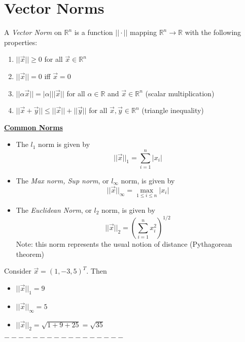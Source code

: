\documentclass[12pt]{article}
\newcommand{\vecx}{\ensuremath{\vec{x}}}
\newcommand{\vecy}{\ensuremath{\vec{y}}}
\newenvironment{definition}[1][Definition]{\begin{trivlist}
\item[\hskip \labelsep {\bfseries #1}]}{\end{trivlist}}
\newenvironment{example}[1][Example]{\begin{trivlist}
\item[\hskip \labelsep {\bfseries #1}]}{\end{trivlist}}
\begin{document}
\section{Vector Norms}

\begin{definition}

A \textit{Vector Norm} on $\mathbb{R}^n$ is a function $||\cdot||$ mapping
$\mathbb{R}^n \rightarrow \mathbb{R}$ with the following properties:

\begin{enumerate}
\item $|| \vecx|| \geq 0$ for all $\vecx \in \mathbb{R}^n$
\item $|| \vecx|| = 0$ iff $\vecx = 0$
\item $|| \alpha\vecx|| = |\alpha| ||\vecx||$ for all $\alpha\in\mathbb{R}$  
and $\vecx \in \mathbb{R}^n$ (scalar multiplication)
\item $|| \vecx + \vecy|| \leq ||\vecx|| + ||\vecy||$ for all $\vecx,\vecy \in 
\mathbb{R}^n$ (triangle inequality)
\end{enumerate}
\end{definition}
\pagebreak

\underline{\textbf{Common Norms}}

\begin{itemize}
\item The $l_1$ norm is given by
\[
||\vecx||_1 = \sum_{i=1}^n|x_i|
\]
\item The \textit{Max norm, Sup norm}, or $l_\infty$ norm, is given by
\[
||\vecx||_\infty = \max_{1\leq i\leq n} |x_i|
\]
\item The \textit{Euclidean Norm}, or $l_2$ norm, is given by
\[
||\vecx||_2 = \left(\sum_{i=1}^n x_i^2\right)^{1/2}
\]
Note: this norm represents the usual notion of distance (Pythagorean theorem)
\end{itemize}

\begin{example}
Consider $\vecx = (1,-3,5)^T$. Then
\begin{itemize}
\item[i.] $||\vecx||_1 = 9$
\item[ii.] $||\vecx||_\infty = 5$
\item[iii.] $||\vecx||_2 = \sqrt{1+9+25} = \sqrt{35}$
\end{itemize}
\end{example}

\begin{center}$-----------------$\end{center}
\end{document}
